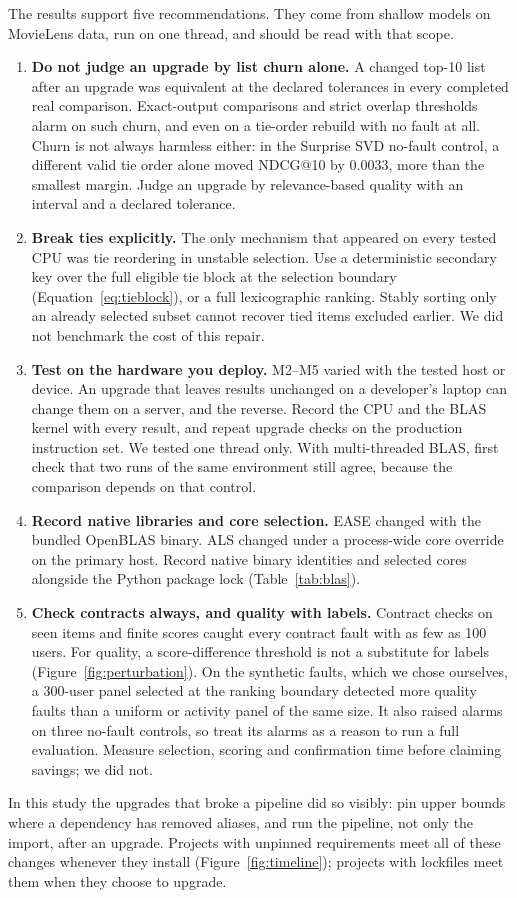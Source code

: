 \documentclass[11pt,a4paper]{article}
\begin{document}
The results support five recommendations. They come from shallow models on
MovieLens data, run on one thread, and should be read with that scope.
\begin{enumerate}
  \item \textbf{Do not judge an upgrade by list churn alone.} A changed top-10
    list after an upgrade was equivalent at the declared tolerances in every
    completed real comparison. Exact-output comparisons and strict overlap
    thresholds alarm on such churn, and even on a tie-order rebuild with no
    fault at all. Churn is not always harmless either: in the Surprise SVD
    no-fault control, a different valid tie order alone moved NDCG@10 by
    0.0033, more than the smallest margin. Judge an upgrade by relevance-based
    quality with an interval and a declared tolerance.
  \item \textbf{Break ties explicitly.} The only mechanism that appeared on
    every tested CPU was tie reordering in unstable selection. Use a
    deterministic secondary key over the full eligible tie block at the
    selection boundary (Equation~\ref{eq:tieblock}), or a full lexicographic
    ranking. Stably sorting only an already selected subset cannot recover
    tied items excluded earlier. We did not benchmark the cost of this repair.
  \item \textbf{Test on the hardware you deploy.} M2--M5 varied with the
    tested host or device. An upgrade that leaves results unchanged on a
    developer's laptop can change them on a server, and the reverse. Record
    the CPU and the BLAS kernel with every result, and repeat upgrade checks
    on the production instruction set. We tested one thread only. With
    multi-threaded BLAS, first check that two runs of the same environment
    still agree, because the comparison depends on that control.
  \item \textbf{Record native libraries and core selection.} EASE changed
    with the bundled OpenBLAS binary. ALS changed under a process-wide core
    override on the primary host. Record native binary identities and
    selected cores alongside the Python package lock (Table~\ref{tab:blas}).
  \item \textbf{Check contracts always, and quality with labels.} Contract
    checks on seen items and finite scores caught every contract fault with as
    few as 100 users. For quality, a score-difference threshold is not a
    substitute for labels (Figure~\ref{fig:perturbation}). On the synthetic
    faults, which we chose ourselves, a 300-user panel selected at the ranking
    boundary detected more quality faults than a uniform or activity panel of
    the same size. It also raised alarms on three no-fault controls, so treat
    its alarms as a reason to run a full evaluation. Measure selection,
    scoring and confirmation time before claiming savings; we did not.
\end{enumerate}
In this study the upgrades that broke a pipeline did so visibly: pin upper
bounds where a dependency has removed aliases, and run the pipeline, not only
the import, after an upgrade. Projects with unpinned requirements meet all of
these changes whenever they install (Figure~\ref{fig:timeline}); projects with
lockfiles meet them when they choose to upgrade.
\end{document}
